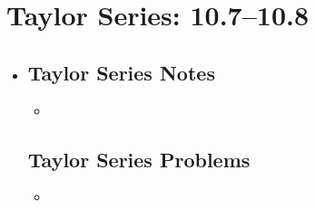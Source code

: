 \section{Taylor Series: 10.7--10.8}
\begin{itemize}
  \item[]

  \subsection{Taylor Series Notes}
  \begin{itemize}
    \item
  \end{itemize}

  \subsection{Taylor Series Problems}
  \begin{itemize}
    \item
  \end{itemize}

\end{itemize}
